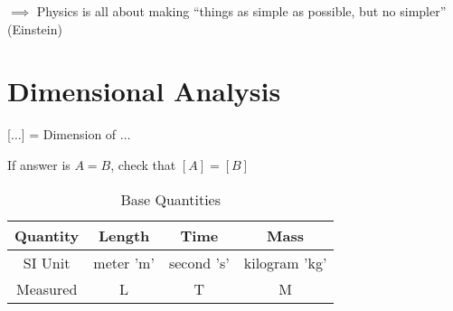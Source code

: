 \documentclass{notes}
\begin{document}
\hspace*{0.5in} \(\implies\) Physics is all about making ``things as simple as possible, but no simpler'' (Einstein)
\newpage
\section{Dimensional Analysis}

 [\(\dots\)] = Dimension of \(\dots\)

If answer is \(A=B\), check that \([A]=[B]\)

\begin{table}[h]
    \caption{Base Quantities}
    \label{Dimensional Analysis}
    \begin{center}
        \begin{tabular}{|c|c|c|c|}
            \hline
            Quantity & Length    & Time       & Mass          \\
            \hline
            SI Unit  & meter 'm' & second 's' & kilogram 'kg' \\
            \hline
            Measured & L         & T          & M             \\
            \hline
        \end{tabular}
    \end{center}
\end{table}
\end{document}
